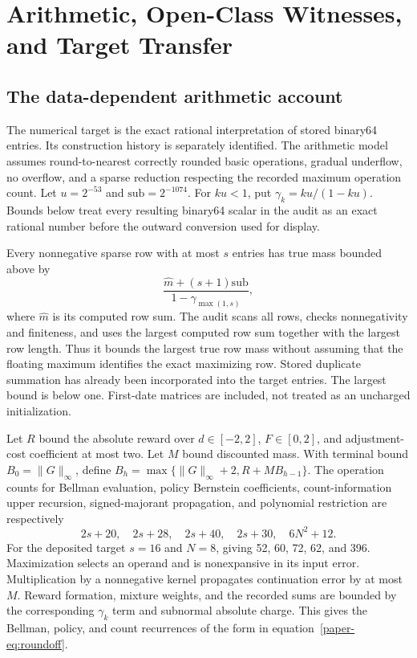 \section{Arithmetic, Open-Class Witnesses, and Target Transfer}
\subsection{The data-dependent arithmetic account}
The numerical target is the exact rational interpretation of stored binary64 entries. Its construction history is separately identified. The arithmetic model assumes round-to-nearest correctly rounded basic operations, gradual underflow, no overflow, and a sparse reduction respecting the recorded maximum operation count. Let $u=2^{-53}$ and $\mathrm{sub}=2^{-1074}$. For $ku<1$, put $\gamma_k=ku/(1-ku)$. Bounds below treat every resulting binary64 scalar in the audit as an exact rational number before the outward conversion used for display.

Every nonnegative sparse row with at most $s$ entries has true mass bounded above by
\[
 \frac{\widehat m+(s+1)\mathrm{sub}}{1-\gamma_{\max(1,s)}},
\]
where $\widehat m$ is its computed row sum. The audit scans all rows, checks nonnegativity and finiteness, and uses the largest computed row sum together with the largest row length. Thus it bounds the largest true row mass without assuming that the floating maximum identifies the exact maximizing row. Stored duplicate summation has already been incorporated into the target entries. The largest bound is below one. First-date matrices are included, not treated as an uncharged initialization.

Let $R$ bound the absolute reward over $d\in[-2,2]$, $F\in[0,2]$, and adjustment-cost coefficient at most two. Let $M$ bound discounted mass. With terminal bound $B_0=\|G\|_\infty$, define $B_h=\max\{\|G\|_\infty+2,R+MB_{h-1}\}$. The operation counts for Bellman evaluation, policy Bernstein coefficients, count-information upper recursion, signed-majorant propagation, and polynomial restriction are respectively
\[
 2s+20,\quad2s+28,\quad2s+40,\quad2s+30,\quad6N^2+12.
\]
For the deposited target $s=16$ and $N=8$, giving 52, 60, 72, 62, and 396. Maximization selects an operand and is nonexpansive in its input error. Multiplication by a nonnegative kernel propagates continuation error by at most $M$. Reward formation, mixture weights, and the recorded sums are bounded by the corresponding $\gamma_k$ term and subnormal absolute charge. This gives the Bellman, policy, and count recurrences of the form in equation~\eqref{paper-eq:roundoff}.

